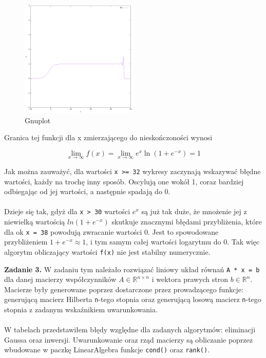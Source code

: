 \documentclass[15pt, a4paper]{article}
\begin{document}
\begin{figure}[h]
    \centering
    \includegraphics[width=0.5\textwidth]{img/gnuplot1.png}
    \caption{Gnuplot}
\end{figure}

\vspace{0.5cm}

\noindent Granica tej funkcji dla x zmierzającego do nieskończoności wynosi 

\[
\lim_{x \to \infty} f(x) = \lim_{x \to \infty} e^x \ln(1 + e^{-x}) = 1
\]

\noindent Jak można zauważyć, dla wartości \verb|x >= 32| wykresy zaczynają wskazywać błędne wartości, każdy na trochę inny sposób. Oscylują one wokół 1, coraz bardziej odbiegając od jej wartości, a następnie spadają do 0. \\\\

\noindent Dzieje się tak, gdyż dla \verb|x > 30| wartości $e^{x}$ są już tak duże, że mnożenie jej z niewielką wartością $ln(1 + e^{-x})$ skutkuje znacznymi błędami przybliżenia, które dla ok \verb|x = 38| powodują zwracanie wartości 0. Jest to spowodowane przybliżeniem $1 + e^{-x} \approx 1$, i tym samym całej wartości logarytmu do 0. Tak więc algorytm obliczający wartości \verb|f(x)| nie jest stabilny numerycznie.

\vspace{0.5cm}

\noindent\hrulefill


\vspace{0.5cm}

\noindent\textbf{Zadanie 3.} W zadaniu tym należało rozwiązać liniowy układ równań \verb|A * x = b| dla danej macierzy współczynników \( A \in \mathbb{R}^{n \times n} \) i wektora prawych stron \( b \in \mathbb{R}^n \). Macierze były generowane poprzez dostarczone przez prowadzącego funkcje: generującą macierz Hilberta \verb|n|-tego stopnia oraz generującą losową macierz \verb|n|-tego stopnia z zadanym wskaźnikiem uwarunkowania.\\\\
W tabelach przedstawiłem błędy względne dla zadanych algorytmów: eliminacji Gaussa oraz inwersji. Uwarunkowanie oraz rząd macierzy są obliczanie poprzez wbudowane w paczkę LinearAlgebra funkcje \verb|cond()| oraz \verb|rank()|.
\end{document}
